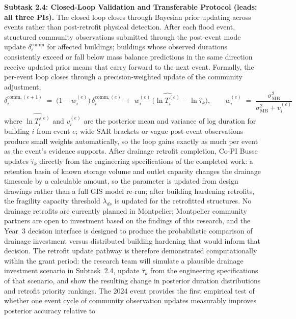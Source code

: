 \documentclass[11pt]{article}
\begin{document}
\textbf{Subtask 2.4: Closed-Loop Validation and Transferable Protocol
(leads: all three PIs).}
The closed loop closes through Bayesian prior updating across events rather than
post-retrofit physical detection.
After each flood event, structured community observations submitted through the
post-event mode update $\delta_i^{\mathrm{comm}}$ for affected buildings;
buildings whose observed durations consistently exceed or fall below mass balance
predictions in the same direction receive updated prior means that carry forward
to the next event.
Formally, the per-event loop closes through a precision-weighted update of the
community adjustment,
\begin{equation}\label{eq:deltaupdate}
  \delta_i^{\mathrm{comm},(e+1)} \;=\;
  \bigl(1 - w_i^{(e)}\bigr)\,\delta_i^{\mathrm{comm},(e)}
  \;+\; w_i^{(e)}\,\bigl(\widehat{\ln T_i^{(e)}} - \ln \hat{\tau}_k\bigr),
  \qquad
  w_i^{(e)} \;=\; \frac{\sigma_{\mathrm{MB}}^{2}}{\sigma_{\mathrm{MB}}^{2} + v_i^{(e)}}
\end{equation}
where $\widehat{\ln T_i^{(e)}}$ and $v_i^{(e)}$ are the posterior mean and
variance of log duration for building $i$ from event $e$; wide SAR brackets or
vague post-event observations produce small weights automatically, so the loop
gains exactly as much per event as the event's evidence supports.
After drainage retrofit completion, Co-PI Busse updates $\hat{\tau}_k$ directly
from the engineering specifications of the completed work: a retention basin of
known storage volume and outlet capacity changes the drainage timescale by a
calculable amount, so the parameter is updated from design drawings rather than
a full GIS model re-run; after building hardening retrofits, the fragility
capacity threshold $\lambda_{ds}$ is updated for the retrofitted structures.
No drainage retrofits are currently planned in Montpelier; Montpelier community
partners are open to investment based on the findings of this research, and the
Year~3 decision interface is designed to produce the probabilistic comparison of
drainage investment versus distributed building hardening that would inform that
decision.
The retrofit update pathway is therefore demonstrated computationally within the
grant period: the research team will simulate a plausible drainage investment
scenario in Subtask~2.4, update $\hat{\tau}_k$ from the engineering
specifications of that scenario, and show the resulting change in posterior
duration distributions and retrofit priority rankings.
The 2024 event provides the first empirical test of whether one event cycle of
community observation updates measurably improves posterior accuracy relative to
\end{document}
